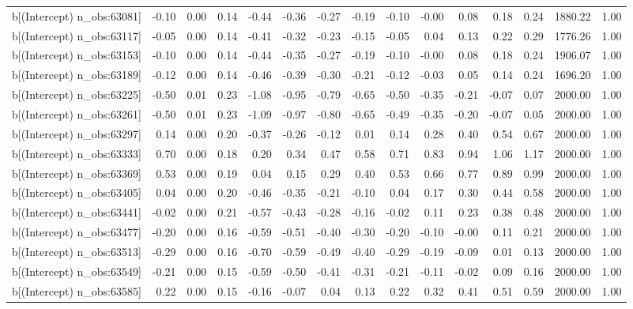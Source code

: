 \begin{table}[ht]
\begin{tabular}{rrrrrrrrrrrrrrr}
  b[(Intercept) n\_obs:63081] & -0.10 & 0.00 & 0.14 & -0.44 & -0.36 & -0.27 & -0.19 & -0.10 & -0.00 & 0.08 & 0.18 & 0.24 & 1880.22 & 1.00 \\ 
  b[(Intercept) n\_obs:63117] & -0.05 & 0.00 & 0.14 & -0.41 & -0.32 & -0.23 & -0.15 & -0.05 & 0.04 & 0.13 & 0.22 & 0.29 & 1776.26 & 1.00 \\ 
  b[(Intercept) n\_obs:63153] & -0.10 & 0.00 & 0.14 & -0.44 & -0.35 & -0.27 & -0.19 & -0.10 & -0.00 & 0.08 & 0.18 & 0.24 & 1906.07 & 1.00 \\ 
  b[(Intercept) n\_obs:63189] & -0.12 & 0.00 & 0.14 & -0.46 & -0.39 & -0.30 & -0.21 & -0.12 & -0.03 & 0.05 & 0.14 & 0.24 & 1696.20 & 1.00 \\ 
  b[(Intercept) n\_obs:63225] & -0.50 & 0.01 & 0.23 & -1.08 & -0.95 & -0.79 & -0.65 & -0.50 & -0.35 & -0.21 & -0.07 & 0.07 & 2000.00 & 1.00 \\ 
  b[(Intercept) n\_obs:63261] & -0.50 & 0.01 & 0.23 & -1.09 & -0.97 & -0.80 & -0.65 & -0.49 & -0.35 & -0.20 & -0.07 & 0.05 & 2000.00 & 1.00 \\ 
  b[(Intercept) n\_obs:63297] & 0.14 & 0.00 & 0.20 & -0.37 & -0.26 & -0.12 & 0.01 & 0.14 & 0.28 & 0.40 & 0.54 & 0.67 & 2000.00 & 1.00 \\ 
  b[(Intercept) n\_obs:63333] & 0.70 & 0.00 & 0.18 & 0.20 & 0.34 & 0.47 & 0.58 & 0.71 & 0.83 & 0.94 & 1.06 & 1.17 & 2000.00 & 1.00 \\ 
  b[(Intercept) n\_obs:63369] & 0.53 & 0.00 & 0.19 & 0.04 & 0.15 & 0.29 & 0.40 & 0.53 & 0.66 & 0.77 & 0.89 & 0.99 & 2000.00 & 1.00 \\ 
  b[(Intercept) n\_obs:63405] & 0.04 & 0.00 & 0.20 & -0.46 & -0.35 & -0.21 & -0.10 & 0.04 & 0.17 & 0.30 & 0.44 & 0.58 & 2000.00 & 1.00 \\ 
  b[(Intercept) n\_obs:63441] & -0.02 & 0.00 & 0.21 & -0.57 & -0.43 & -0.28 & -0.16 & -0.02 & 0.11 & 0.23 & 0.38 & 0.48 & 2000.00 & 1.00 \\ 
  b[(Intercept) n\_obs:63477] & -0.20 & 0.00 & 0.16 & -0.59 & -0.51 & -0.40 & -0.30 & -0.20 & -0.10 & -0.00 & 0.11 & 0.21 & 2000.00 & 1.00 \\ 
  b[(Intercept) n\_obs:63513] & -0.29 & 0.00 & 0.16 & -0.70 & -0.59 & -0.49 & -0.40 & -0.29 & -0.19 & -0.09 & 0.01 & 0.13 & 2000.00 & 1.00 \\ 
  b[(Intercept) n\_obs:63549] & -0.21 & 0.00 & 0.15 & -0.59 & -0.50 & -0.41 & -0.31 & -0.21 & -0.11 & -0.02 & 0.09 & 0.16 & 2000.00 & 1.00 \\ 
  b[(Intercept) n\_obs:63585] & 0.22 & 0.00 & 0.15 & -0.16 & -0.07 & 0.04 & 0.13 & 0.22 & 0.32 & 0.41 & 0.51 & 0.59 & 2000.00 & 1.00 \\ 

\end{tabular}
\end{table}
